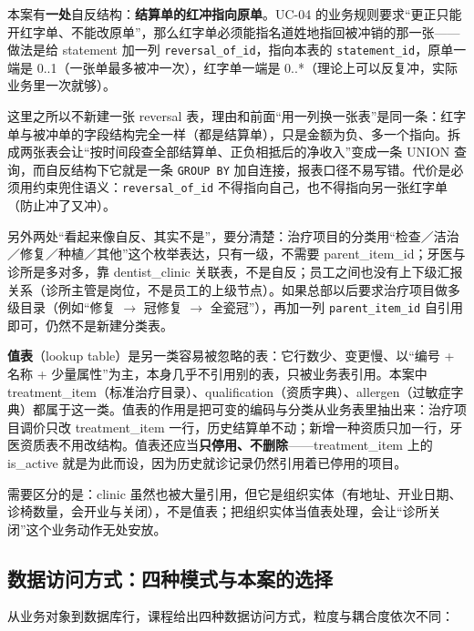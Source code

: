 \documentclass[11pt,a4paper]{ctexart}
\begin{document}
本案有\textbf{一处}自反结构：\textbf{结算单的红冲指向原单}。UC-04 的业务规则要求“更正只能开红字单、不能改原单”，那么红字单必须能指名道姓地指回被冲销的那一张——做法是给 statement 加一列 \texttt{reversal\_of\_id}，指向本表的 \texttt{statement\_id}，原单一端是 0..1（一张单最多被冲一次），红字单一端是 0..*（理论上可以反复冲，实际业务里一次就够）。

这里之所以不新建一张 reversal 表，理由和前面“用一列换一张表”是同一条：红字单与被冲单的字段结构完全一样（都是结算单），只是金额为负、多一个指向。拆成两张表会让“按时间段查全部结算单、正负相抵后的净收入”变成一条 UNION 查询，而自反结构下它就是一条 \texttt{GROUP BY} 加自连接，报表口径不易写错。代价是必须用约束兜住语义：\texttt{reversal\_of\_id} 不得指向自己，也不得指向另一张红字单（防止冲了又冲）。

另外两处“看起来像自反、其实不是”，要分清楚：治疗项目的分类用“检查／洁治／修复／种植／其他”这个枚举表达，只有一级，不需要 parent\_item\_id；牙医与诊所是多对多，靠 dentist\_clinic 关联表，不是自反；员工之间也没有上下级汇报关系（诊所主管是岗位，不是员工的上级节点）。如果总部以后要求治疗项目做多级目录（例如“修复 $\rightarrow$ 冠修复 $\rightarrow$ 全瓷冠”），再加一列 \texttt{parent\_item\_id} 自引用即可，仍然不是新建分类表。

\textbf{值表}（lookup table）是另一类容易被忽略的表：它行数少、变更慢、以“编号 + 名称 + 少量属性”为主，本身几乎不引用别的表，只被业务表引用。本案中 treatment\_item（标准治疗目录）、qualification（资质字典）、allergen（过敏症字典）都属于这一类。值表的作用是把可变的编码与分类从业务表里抽出来：治疗项目调价只改 treatment\_item 一行，历史结算单不动；新增一种资质只加一行，牙医资质表不用改结构。值表还应当\textbf{只停用、不删除}——treatment\_item 上的 is\_active 就是为此而设，因为历史就诊记录仍然引用着已停用的项目。

需要区分的是：clinic 虽然也被大量引用，但它是组织实体（有地址、开业日期、诊椅数量，会开业与关闭），不是值表；把组织实体当值表处理，会让“诊所关闭”这个业务动作无处安放。

\subsection{数据访问方式：四种模式与本案的选择}

从业务对象到数据库行，课程给出四种数据访问方式，粒度与耦合度依次不同：
\end{document}
